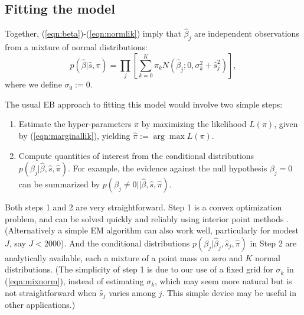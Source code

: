 \documentclass[11pt]{article}
\def\bhat{\hat{\beta}}
\def\shat{\hat{s}}
\begin{document}
% 
% 
 

\subsection*{Fitting the model}
 
Together, (\ref{eqn:beta})-(\ref{eqn:normlik}) imply that $\bhat_j$ are independent observations from a mixture of normal distributions:
\begin{equation} \label{eqn:marginallik}
p(\bhat | \shat, \pi) =   \prod_j  [\sum_{k=0}^K \pi_k N(\bhat_j; 0, \sigma_k^2 + \shat_j^2)],
\end{equation}
where we define $\sigma_0:=0$.

The usual EB approach to fitting this model would involve two simple steps:
\begin{enumerate}
\item Estimate the hyper-parameters $\pi$ by maximizing the likelihood $L(\pi)$, given by (\ref{eqn:marginallik}), yielding $\hat{\pi} := \arg \max L(\pi)$.
\item Compute quantities of interest from the conditional distributions $p(\beta_j | \bhat, \shat, \hat{\pi})$. For example, the evidence
against the null hypothesis $\beta_j=0$ can be summarized by $p(\beta_j \neq 0 | | \bhat, \shat,\hat{\pi})$.
\end{enumerate}
Both steps 1 and 2 are very straightforward. Step 1 is a convex optimization problem, and can be solved quickly and reliably using interior point methods \cite{boyd2004convex,koenker2013convex}. (Alternatively a simple EM algorithm can also work well, particularly for modest $J$, say $J<2000$). 
And the conditional distributions $p(\beta_j | \bhat_j, \shat_j,\hat{\pi})$ in Step 2 are analytically available, each a mixture of a point mass on zero and $K$ normal distributions.
(The simplicity of step 1 is due to our use of a fixed grid for $\sigma_k$ in (\ref{eqn:mixnorm}), instead of estimating $\sigma_k$,
which may seem more natural but is not straightforward when $\shat_j$ varies among $j$. This simple device may be useful in other applications.)
\end{document}

